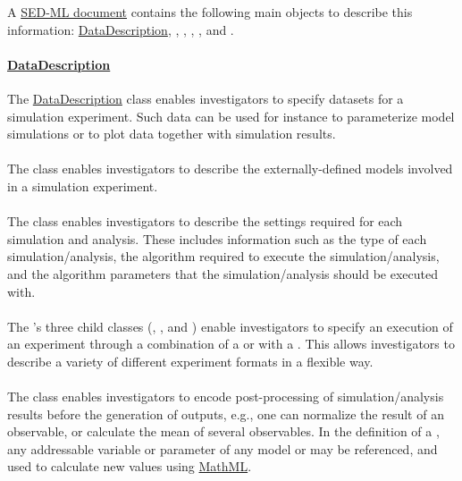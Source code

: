 A \hyperref[class:sed-ml]{SED-ML document} contains the following main objects to describe this information: \hyperref[class:dataDescription]{DataDescription}, \Model, \Simulation, \AbstractTask, \DataGenerator, and \Output.

\paragraph*{\hyperref[class:dataDescription]{DataDescription}}
The \hyperref[class:dataDescription]{DataDescription} class enables investigators to specify datasets for a simulation experiment. Such data can be used for instance to parameterize model simulations or to plot data together with simulation results.

\paragraph*{\Model}
The \Model class enables investigators to describe the externally-defined models involved in a simulation experiment.

\paragraph*{\Simulation}
The \Simulation class enables investigators to describe the settings required for each simulation and analysis. These includes information such as the type of each simulation/analysis, the algorithm required to execute the simulation/analysis, and the algorithm parameters that the simulation/analysis should be executed with.

\paragraph*{\AbstractTask}
The \AbstractTask's three child classes (\Task, \RepeatedTask, and \ParameterEstimationTask) enable investigators to specify an execution of an experiment through a combination of a \Simulation or \FitExperiment with a \Model. This allows investigators to describe a variety of different experiment formats in a flexible way.

\paragraph*{\DataGenerator}
The \DataGenerator class enables investigators to encode post-processing of simulation/analysis results before the generation of outputs, e.g., one can normalize the result of an observable, or calculate the mean of several observables. In the definition of a \DataGenerator, any addressable variable or parameter of any model or \DataSource may be referenced, and used to calculate new values using \hyperref[sec:mathML]{MathML}.

